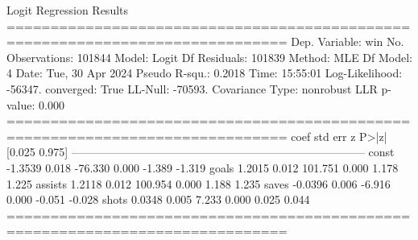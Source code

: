                            Logit Regression Results                           
==============================================================================
Dep. Variable:                    win   No. Observations:               101844
Model:                          Logit   Df Residuals:                   101839
Method:                           MLE   Df Model:                            4
Date:                Tue, 30 Apr 2024   Pseudo R-squ.:                  0.2018
Time:                        15:55:01   Log-Likelihood:                -56347.
converged:                       True   LL-Null:                       -70593.
Covariance Type:            nonrobust   LLR p-value:                     0.000
==============================================================================
                 coef    std err          z      P>|z|      [0.025      0.975]
------------------------------------------------------------------------------
const         -1.3539      0.018    -76.330      0.000      -1.389      -1.319
goals          1.2015      0.012    101.751      0.000       1.178       1.225
assists        1.2118      0.012    100.954      0.000       1.188       1.235
saves         -0.0396      0.006     -6.916      0.000      -0.051      -0.028
shots          0.0348      0.005      7.233      0.000       0.025       0.044
==============================================================================